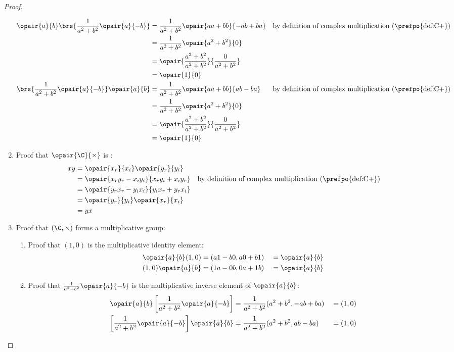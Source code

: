 \begin{proof}
\begin{enumerate}
\begin{align*}
         \opair{a}{b}\brs{\frac{1}{a^2+b^2}\opair{a}{-b}}
        &= \frac{1}{a^2+b^2}\opair{aa+bb}{-ab+ba}
        && \text{by definition of complex multiplication (\prefpo{def:C+})}
      \\&= \frac{1}{a^2+b^2}\opair{a^2+b^2}{0}
      \\&= \opair{\frac{a^2+b^2}{a^2+b^2}}{\frac{0}{a^2+b^2}}
      \\&= \opair{1}{0}
        \\
      \brs{\frac{1}{a^2+b^2}\opair{a}{-b}}\opair{a}{b}
        &= \frac{1}{a^2+b^2}\opair{aa+bb}{ab-ba}
        && \text{by definition of complex multiplication (\prefpo{def:C+})}
      \\&= \frac{1}{a^2+b^2}\opair{a^2+b^2}{0}
      \\&= \opair{\frac{a^2+b^2}{a^2+b^2}}{\frac{0}{a^2+b^2}}
      \\&= \opair{1}{0}
    \end{align*}
  
  \item Proof that $\opair{\C}{\times}$ is :
    \begin{align*}
      xy
        &= \opair{x_r}{x_i}\opair{y_r}{y_i}
      \\&= \opair{x_ry_r-x_iy_i}{x_ry_i+x_iy_r}
        && \text{by definition of complex multiplication (\prefpo{def:C+})}
      \\&= \opair{y_rx_r-y_ix_i}{y_ix_r+y_rx_i}
      \\&= \opair{y_r}{y_i}\opair{x_r}{x_i}
      \\&= yx
    \end{align*}

  \item Proof that $(\C,\times)$ forms a multiplicative group:
    \begin{enumerate}
      \item Proof that $(1,0)$ is the multiplicative identity element:
        \begin{align*}
          \opair{a}{b}(1,0) &= (a1-b0,a0+b1) &&= \opair{a}{b} \\
          (1,0)\opair{a}{b} &= (1a-0b,0a+1b) &&= \opair{a}{b}
        \end{align*}
  
      \item Proof that $\frac{1}{a^2+b^2}\opair{a}{-b}$ is the multiplicative inverse element of $\opair{a}{b}$:
        \begin{align*}
          \opair{a}{b}\left[\frac{1}{a^2+b^2}\opair{a}{-b}\right] &= \frac{1}{a^2+b^2}(a^2+b^2,-ab+ba) &&= (1,0) \\
          \left[\frac{1}{a^2+b^2}\opair{a}{-b}\right]\opair{a}{b} &= \frac{1}{a^2+b^2}(a^2+b^2,ab-ba)  &&= (1,0)
        \end{align*}


\end{enumerate}
\end{enumerate}
\end{proof}

